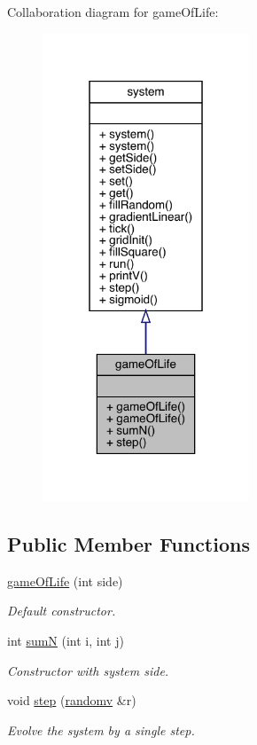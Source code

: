 Collaboration diagram for game\+Of\+Life\+:
\nopagebreak
\begin{figure}[H]
\begin{center}
\leavevmode
\includegraphics[width=175pt]{classgame_of_life__coll__graph}
\end{center}
\end{figure}
\subsection*{Public Member Functions}
\begin{DoxyCompactItemize}
\item 
\mbox{\label{classgame_of_life_aa6b581822e3bc0ab045afebd7288d55e}} 
\hyperlink{classgame_of_life_aa6b581822e3bc0ab045afebd7288d55e}{game\+Of\+Life} (int side)
\begin{DoxyCompactList}\small\item\em Default constructor. \end{DoxyCompactList}\item 
int \hyperlink{classgame_of_life_a30febaa79f1e87d35b4eeae4f558fe13}{sumN} (int i, int j)
\begin{DoxyCompactList}\small\item\em Constructor with system side. \end{DoxyCompactList}\item 
\mbox{\label{classgame_of_life_a7de2d57809b15f938ad18b8c30ddf9bf}} 
void \hyperlink{classgame_of_life_a7de2d57809b15f938ad18b8c30ddf9bf}{step} (\hyperlink{classrandomv}{randomv} \&r)
\begin{DoxyCompactList}\small\item\em Evolve the system by a single step. \end{DoxyCompactList}\end{DoxyCompactItemize}


